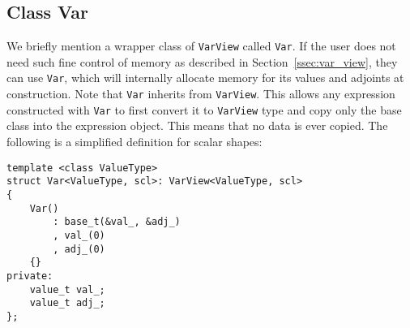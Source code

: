 \subsection{Class Var}

We briefly mention a wrapper class of \verb|VarView| called \verb|Var|.
If the user does not need such fine control of memory as described in Section~\ref{ssec:var_view},
they can use \verb|Var|, which will internally allocate memory for its values and adjoints at construction.
Note that \verb|Var| inherits from \verb|VarView|.
This allows any expression constructed with \verb|Var| to first convert it to \verb|VarView| type
and copy only the base class into the expression object.
This means that no data is ever copied.
The following is a simplified definition for scalar shapes:
\begin{lstlisting}[style=customcpp]
template <class ValueType>
struct Var<ValueType, scl>: VarView<ValueType, scl>
{
    Var()
        : base_t(&val_, &adj_) 
        , val_(0)
        , adj_(0)
    {}
private:
    value_t val_;
    value_t adj_;
};
\end{lstlisting}

